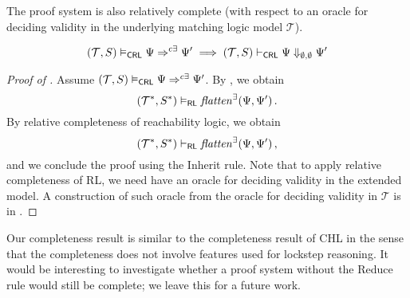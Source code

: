 


The proof system is also relatively complete (with respect to an oracle for deciding validity
in the underlying matching logic model $\mathcal{T}$).
\begin{theorem}\label{thm:relativeCompleteness}
  \begin{equation*}
      (\mathcal{T}, S) \vDash_{\mathsf{CRL}} \Psi \Rightarrow^{c\exists} \Psi^\prime \implies
      (\mathcal{T}, S) \vdash_{\mathsf{CRL}} \Psi \Downarrow_{\emptyset,\emptyset} \Psi^\prime
  \end{equation*}
  \end{theorem}
  \begin{proof}[Proof of ]
  Assume $(\mathcal{T}, S) \vDash_{\mathsf{CRL}} \Psi \Rightarrow^{c\exists} \Psi^\prime$.
  By , 
  we obtain
  \begin{equation*}
    (\mathcal{T}^*, S^*) \vDash_{\mathsf{RL}}
    \mathit{flatten}^\exists(\Psi, \Psi^\prime) \, .
  \end{equation*}
  By relative completeness of reachability logic, we obtain
  \begin{equation*}
    (\mathcal{T}^*, S^*) \vdash_{\mathsf{RL}}
    \mathit{flatten}^\exists(\Psi, \Psi^\prime) \, ,
  \end{equation*}
  and we conclude the proof using the Inherit rule.
  Note that to apply relative completeness of RL, we need have an oracle for deciding validity in the extended model.
  A construction of such oracle from the oracle for deciding validity in $\mathcal{T}$ is in .
  \end{proof}
Our completeness result is similar to the completeness result of CHL in the sense that the completeness
does not involve features used for lockstep reasoning.
It would be interesting to investigate whether a proof system without the Reduce rule would still be complete;
we leave this for a future work.

